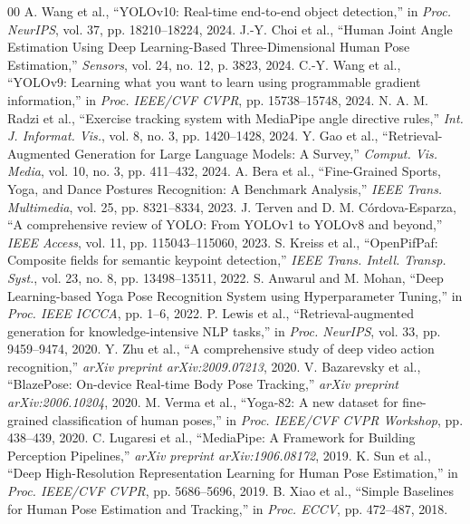 \documentclass{ieeeaccess}
\begin{document}
\begin{thebibliography}{00}
 A. Wang et al., ``YOLOv10: Real-time end-to-end object detection,'' in \textit{Proc. NeurIPS}, vol. 37, pp. 18210--18224, 2024.
 J.-Y. Choi et al., ``Human Joint Angle Estimation Using Deep Learning-Based Three-Dimensional Human Pose Estimation,'' \textit{Sensors}, vol. 24, no. 12, p. 3823, 2024.
 C.-Y. Wang et al., ``YOLOv9: Learning what you want to learn using programmable gradient information,'' in \textit{Proc. IEEE/CVF CVPR}, pp. 15738--15748, 2024.
 N. A. M. Radzi et al., ``Exercise tracking system with MediaPipe angle directive rules,'' \textit{Int. J. Informat. Vis.}, vol. 8, no. 3, pp. 1420--1428, 2024.
 Y. Gao et al., ``Retrieval-Augmented Generation for Large Language Models: A Survey,'' \textit{Comput. Vis. Media}, vol. 10, no. 3, pp. 411--432, 2024.
 A. Bera et al., ``Fine-Grained Sports, Yoga, and Dance Postures Recognition: A Benchmark Analysis,'' \textit{IEEE Trans. Multimedia}, vol. 25, pp. 8321--8334, 2023.
 J. Terven and D. M. Córdova-Esparza, ``A comprehensive review of YOLO: From YOLOv1 to YOLOv8 and beyond,'' \textit{IEEE Access}, vol. 11, pp. 115043--115060, 2023.
 S. Kreiss et al., ``OpenPifPaf: Composite fields for semantic keypoint detection,'' \textit{IEEE Trans. Intell. Transp. Syst.}, vol. 23, no. 8, pp. 13498--13511, 2022.
 S. Anwarul and M. Mohan, ``Deep Learning-based Yoga Pose Recognition System using Hyperparameter Tuning,'' in \textit{Proc. IEEE ICCCA}, pp. 1--6, 2022.
 P. Lewis et al., ``Retrieval-augmented generation for knowledge-intensive NLP tasks,'' in \textit{Proc. NeurIPS}, vol. 33, pp. 9459--9474, 2020.
 Y. Zhu et al., ``A comprehensive study of deep video action recognition,'' \textit{arXiv preprint arXiv:2009.07213}, 2020.
 V. Bazarevsky et al., ``BlazePose: On-device Real-time Body Pose Tracking,'' \textit{arXiv preprint arXiv:2006.10204}, 2020.
 M. Verma et al., ``Yoga-82: A new dataset for fine-grained classification of human poses,'' in \textit{Proc. IEEE/CVF CVPR Workshop}, pp. 438--439, 2020.
 C. Lugaresi et al., ``MediaPipe: A Framework for Building Perception Pipelines,'' \textit{arXiv preprint arXiv:1906.08172}, 2019.
 K. Sun et al., ``Deep High-Resolution Representation Learning for Human Pose Estimation,'' in \textit{Proc. IEEE/CVF CVPR}, pp. 5686--5696, 2019.
 B. Xiao et al., ``Simple Baselines for Human Pose Estimation and Tracking,'' in \textit{Proc. ECCV}, pp. 472--487, 2018.

\end{thebibliography}
\end{document}

